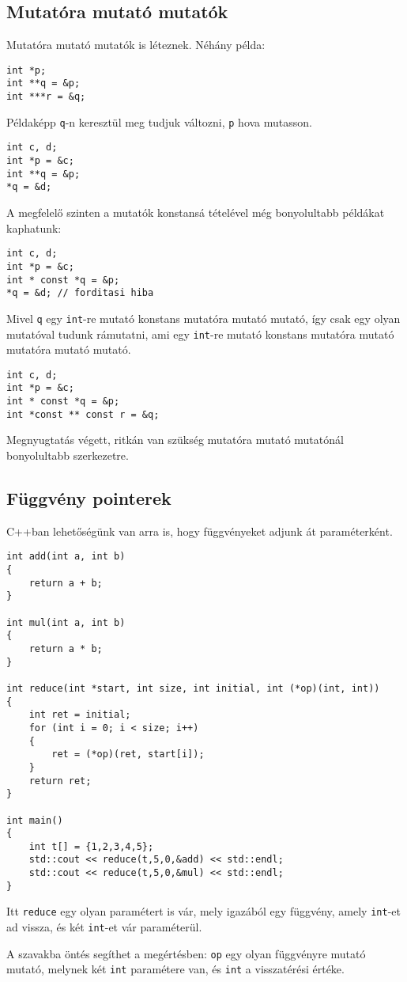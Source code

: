 \documentclass[a4paper,11.5pt,table]{article}
\begin{document}
	\subsection{Mutatóra mutató mutatók} 
	Mutatóra mutató mutatók is léteznek. Néhány példa:
	\begin{lstlisting}
int *p;
int **q = &p;
int ***r = &q;
	\end{lstlisting}
	Példaképp \texttt{q}-n keresztül meg tudjuk változni, \texttt{p} hova mutasson.
	\begin{lstlisting}
int c, d;
int *p = &c;
int **q = &p;
*q = &d;
	\end{lstlisting}
	A megfelelő szinten a mutatók konstansá tételével még bonyolultabb példákat kaphatunk:
	\begin{lstlisting}
int c, d;
int *p = &c;
int * const *q = &p;
*q = &d; // forditasi hiba
	\end{lstlisting}
	Mivel \texttt{q} egy \texttt{int}-re mutató konstans mutatóra mutató mutató, így csak egy olyan mutatóval tudunk rámutatni, ami egy \texttt{int}-re mutató konstans mutatóra mutató mutatóra mutató mutató.
	\begin{lstlisting}
int c, d;
int *p = &c;
int * const *q = &p;
int *const ** const r = &q;
	\end{lstlisting}
	\begin{note}
		Megnyugtatás végett, ritkán van szükség mutatóra mutató mutatónál bonyolultabb szerkezetre.
	\end{note}
	\subsection{Függvény pointerek}
	C++ban lehetőségünk van arra is, hogy függvényeket adjunk át paraméterként.
	\begin{lstlisting}
int add(int a, int b)
{
	return a + b;
}

int mul(int a, int b)
{
	return a * b;
}

int reduce(int *start, int size, int initial, int (*op)(int, int))
{
	int ret = initial;
	for (int i = 0; i < size; i++)
	{
		ret = (*op)(ret, start[i]);
	}
	return ret;
}

int main()
{
	int t[] = {1,2,3,4,5};
	std::cout << reduce(t,5,0,&add) << std::endl;
	std::cout << reduce(t,5,0,&mul) << std::endl;
}
	\end{lstlisting}
	
	Itt \texttt{reduce} egy olyan paramétert is vár, mely igazából egy függvény, amely \texttt{int}-et ad vissza, és két \texttt{int}-et vár paraméterül.
	\begin{note}
		A szavakba öntés segíthet a megértésben: \texttt{op} egy olyan függvényre mutató mutató, melynek két \texttt{int} paramétere van, és \texttt{int} a visszatérési értéke.
	\end{note}
	
\end{document}
